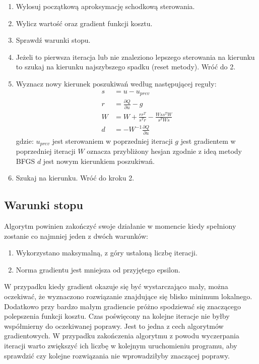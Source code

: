 \begin{enumerate}
\item Wylosuj początkową aproksymację schodkową sterowania.
\item Wylicz wartość oraz gradient funkcji kosztu.
\item Sprawdź warunki stopu.
\item Jeżeli to pierwsza iteracja lub nie znaleziono lepszego sterowania na kierunku to szukaj na kierunku najszybszego spadku (reset metody). Wróć do 2.
\item Wyznacz nowy kierunek poszukiwań według następującej reguły:
\begin{equation}
\begin{aligned}
s &= u - u_{prev}\\
r &= \frac{\partial Q}{\partial u} - g\\
W &= W + \frac{rr^T}{s^Tr} - \frac{Wss^TW}{s^TWs}\\
d &= -W^{-1}\frac{\partial Q}{\partial u}
\end{aligned}
\end{equation}
\noindent gdzie:\newline
\(u_{prev}\) jest sterowaniem w poprzedniej iteracji\newline
\(g\) jest gradientem w poprzedniej iteracji\newline
\(W\) oznacza przybliżony hesjan zgodnie z ideą metody BFGS\newline
\(d\) jest nowym kierunkiem poszukiwań.
\item Szukaj na kierunku. Wróć do kroku 2.
\end{enumerate}

\subsection{Warunki stopu}
Algorytm powinien zakończyć swoje działanie w momencie kiedy spełniony zostanie co najmniej jeden z dwóch warunków: 
\begin{enumerate}
\item Wykorzystano maksymalną, z góry ustaloną liczbę iteracji.
\item Norma gradientu jest mniejsza od przyjętego epsilon.
\end{enumerate}
W przypadku kiedy gradient okazuje się być wystarczająco mały, można oczekiwać, że wyznaczono rozwiązanie znajdujące się blisko minimum lokalnego. Dodatkowo przy bardzo małym gradiencie próżno spodziewać się znaczącego polepszenia funkcji kosztu. Czas poświęcony na kolejne iteracje nie byłby współmierny do oczekiwanej poprawy. Jest to jedna z cech algorytmów gradientowych. W przypadku zakończenia algorytmu z powodu wyczerpania iteracji warto zwiększyć ich liczbę w kolejnym uruchomieniu programu, aby sprawdzić czy kolejne rozwiązania nie wprowadziłyby znaczącej poprawy.

